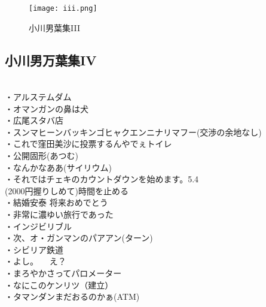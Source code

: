 \begin{figure}[H]
\centering
\texttt{[image: iii.png]}
    \caption{小川男葉集III}
    \label{iii}
\end{figure}



\newpage
\subsection{小川男万葉集IV}
　\\
・アルステムダム\\
・オマンガンの鼻は犬\\
・広尾スタバ店\\
・スンマヒーンバッキンゴヒャクエンニナリマフー(交渉の余地なし)\\
・これで窪田美沙に投票するんやでぇトイレ\\
・公開固形(あつむ)\\
・なんかなああ(サイリウム)\\
・それではチェキのカウントダウンを始めます。5.4\\
    (2000円握りしめて)時間を止める\\
・結婚安泰 将来おめでとう\\
・非常に濃ゆい旅行であった\\
・インジビリブル\\
・次、オ・ガンマンのパアアン(ターン)\\
・シビリア鉄道\\
・よし。   \ \      え？\\
・まろやかさってパロメーター\\
・なにこのケンリツ（建立）\\
・タマンダンまだおるのかぁ(ATM)\\

\newpage
